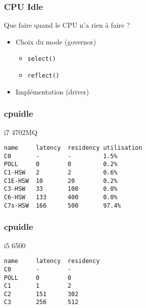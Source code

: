 \begin{frame}
	\frametitle{CPU Idle}
	\begin{block}{Que faire quand le CPU n'a rien à faire ?}
	\begin{itemize}
		\item Choix du mode (governor)
			\begin{itemize}
				\item \texttt{select()}
				\item \texttt{reflect()}
			\end{itemize}
		\item Implémentation (driver)
	\end{itemize}
	\end{block}
\end{frame}

\begin{frame}[fragile]
	\frametitle{cpuidle}
	\begin{block}{i7 4702MQ }
\begin{verbatim}
name     latency  residency utilisation
C0       -        -         1.5%
POLL     0        0         0.2%
C1-HSW   2        2         0.6%
C1E-HSW  10       20        0.2%
C3-HSW   33       100       0.0%
C6-HSW   133      400       0.0%
C7s-HSW  166      500       97.4%
\end{verbatim}
		\end{block}
\end{frame}

\begin{frame}[fragile]
	\frametitle{cpuidle}
	\begin{block}{i5 6500}
\begin{verbatim}
name     latency  residency
C0       -        -         
POLL     0        0         
C1       1        2         
C2       151      302       
C3       256      512       
\end{verbatim}
		\end{block}
\end{frame}


